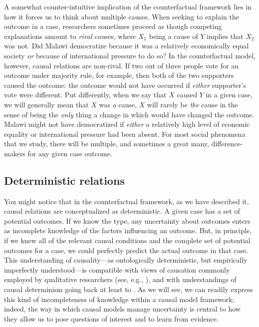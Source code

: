 \documentclass[
  12pt,
]{book}
\begin{document}
A somewhat counter-intuitive implication of the counterfactual framework lies in how it forces us to think about multiple causes. When seeking to explain the outcome in a case, researchers sometimes proceed as though competing explanations amount to \emph{rival} causes, where \(X_1\) being a cause of \(Y\) implies that \(X_2\) was not. Did Malawi democratize because it was a relatively economically equal society \emph{or} because of international pressure to do so? In the counterfactual model, however, causal relations are non-rival. If two out of three people vote for an outcome under majority rule, for example, then both of the two supporters caused the outcome: the outcome would not have occurred if \emph{either} supporter's vote were different. Put differently, when we say that \(X\) caused \(Y\) in a given case, we will generally mean that \(X\) was \emph{a} cause, \(X\) will rarely be \emph{the} cause in the sense of being the \emph{only} thing a change in which would have changed the outcome. Malawi might not have democratized if \emph{either} a relatively high level of economic equality or international pressure had been absent. For most social phenomena that we study, there will be multiple, and sometimes a great many, difference-makers for any given case outcome.

\hypertarget{deterministic-relations}{%
\subsection{Deterministic relations}\label{deterministic-relations}}

You might notice that in the counterfactual framework, as we have described it, causal relations are conceptualized as deterministic. A given case has a set of potential outcomes. If we know the type, any uncertainty about outcomes enters as incomplete knowledge of the factors influencing an outcome. But, in principle, if we knew all of the relevant causal conditions and the complete set of potential outcomes for a case, we could perfectly predict the actual outcome in that case. This understanding of causality---as ontologically deterministic, but empirically imperfectly understood---is compatible with views of causation commonly employed by qualitative researchers (see, e.g., \citet{mahoney2008toward}), and with understandings of causal determinism going back at least to \citet{laplace1901philosophical}. As we will see, we can readily express this kind of incompleteness of knowledge within a causal model framework; indeed, the way in which causal models manage uncertainty is central to how they allow us to pose questions of interest and to learn from evidence.
\end{document}
